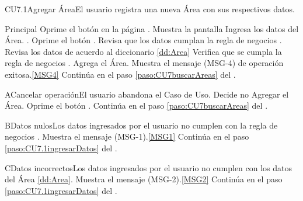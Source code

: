 	\begin{UseCase}{CU7.1}{Agregar Área}{El usuario registra una nueva Área con sus respectivos datos.}
	\end{UseCase}

	\begin{UCtrayectoria}{Principal}
			\UCpaso[\UCactor] Oprime el botón  en la página .
			\UCpaso Muestra la pantalla  
			\UCpaso [\UCactor] Ingresa los datos del Área.  \label{paso:CU7.1ingresarDatos}.
			\UCpaso [\UCactor] Oprime el botón .
			\UCpaso Revisa que los datos cumplan la regla de negocios . 
			\UCpaso Revisa los datos de acuerdo al diccionario \ref{dd:Area} 
			\UCpaso Verifica que se cumpla la regla de negocios .  
			\UCpaso Agrega el Área.
			\UCpaso Muestra el mensaje (MSG-4) de operación exitosa.\ref{MSG4}
			\UCpaso Continúa en el paso \ref{paso:CU7buscarAreas} del .
	\end{UCtrayectoria}
	\newpage
	\begin{UCtrayectoriaA}{A}{Cancelar operación}{El usuario abandona el Caso de Uso.}
			\UCpaso[\UCactor] Decide no Agregar el Área.
			\UCpaso[\UCactor] Oprime el botón .
			\UCpaso Continúa en el paso \ref{paso:CU7buscarAreas} del .
	\end{UCtrayectoriaA}
		
	\begin{UCtrayectoriaA}{B}{Datos nulos}{Los datos ingresados por el usuario  no cumplen con la regla de negocios .}
			\UCpaso Muestra el mensaje (MSG-1).\ref{MSG1}
			\UCpaso Continúa en el paso \ref{paso:CU7.1ingresarDatos} del .
	\end{UCtrayectoriaA}
	\begin{UCtrayectoriaA}{C}{Datos incorrectos}{Los datos ingresados por el usuario  no cumplen con los datos del Área \ref{dd:Area}.}
			\UCpaso Muestra el mensaje (MSG-2).\ref{MSG2}
			\UCpaso Continúa en el paso \ref{paso:CU7.1ingresarDatos} del .
	\end{UCtrayectoriaA}



